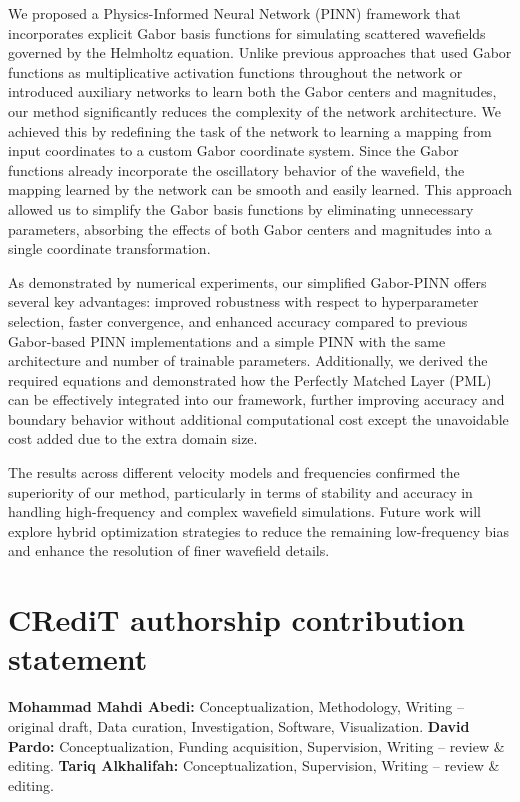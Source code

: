 \documentclass[authoryear, preprint, 12pt]{elsarticle}
\begin{document}
We proposed a  Physics-Informed Neural Network (PINN) framework that incorporates explicit Gabor basis functions for simulating scattered wavefields governed by the Helmholtz equation. Unlike previous approaches that used Gabor functions as multiplicative activation functions throughout the network or introduced auxiliary networks to learn both the Gabor centers and magnitudes, our method significantly reduces the complexity of the network architecture. We achieved this by redefining the task of the network to learning a mapping from input coordinates to a custom Gabor coordinate system. Since the Gabor functions already incorporate the oscillatory behavior of the wavefield, the mapping learned by the network can be smooth and easily learned. This approach allowed us to simplify the Gabor basis functions by eliminating unnecessary parameters, absorbing the effects of both Gabor centers and magnitudes into a single coordinate transformation. 

As demonstrated by numerical experiments, our simplified Gabor-PINN offers several key advantages: improved robustness with respect to hyperparameter selection, faster convergence, and enhanced accuracy compared to previous Gabor-based PINN implementations and a simple PINN with the same architecture and number of trainable parameters. Additionally, we derived the required equations and demonstrated how the Perfectly Matched Layer (PML) can be effectively integrated into our framework, further improving accuracy and boundary behavior without additional computational cost except the unavoidable cost added due to the extra domain size.

The results across different velocity models and frequencies confirmed the superiority of our method, particularly in terms of stability and accuracy in handling high-frequency and complex wavefield simulations. Future work will explore hybrid optimization strategies to reduce the remaining low-frequency bias and enhance the resolution of finer wavefield details.

\section*{CRediT authorship contribution statement}

\textbf{Mohammad Mahdi Abedi:} Conceptualization, Methodology, Writing – original draft, Data curation, Investigation, Software, Visualization.  
\textbf{David Pardo:} Conceptualization, Funding acquisition, Supervision, Writing – review \& editing.  
\textbf{Tariq Alkhalifah:} Conceptualization, Supervision, Writing – review \& editing.
\end{document}

